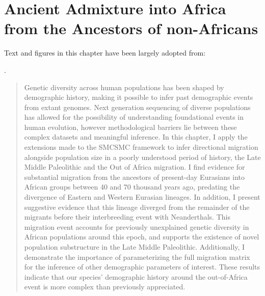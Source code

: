 

\chapter{Ancient Admixture into Africa from the Ancestors of non-Africans} \label{ch:aaa}

Text and figures in this chapter have been largely adopted from:

{\small {}. }


\begin{quote}
    \noindent \small Genetic diversity across human populations has been shaped by demographic history, making it possible to infer past demographic events from extant genomes. 
    Next generation sequencing of diverse populations has allowed for the possibility of understanding foundational events in human evolution, however methodological barriers lie between these complex datasets and meaningful inference. 
    In this chapter, I apply the extensions made to the SMCSMC framework to infer directional migration alongside population size in a poorly understood period of history, the Late Middle Paleolithic and the Out of Africa migration. 
    I find evidence for substantial migration from the ancestors of present-day Eurasians into African groups between 40 and 70 thousand years ago, predating the divergence of Eastern and Western Eurasian lineages. In addition, I present suggestive evidence that this lineage diverged from the remainder of the migrants before their interbreeding event with Neanderthals. This migration event accounts for previously unexplained genetic diversity in African populations around this epoch, and supports the existence of novel population substructure in the Late Middle Paleolithic. Additionally, I demonstrate the importance of parameterizing the full migration matrix for the inference of other demographic parameters of interest. These results indicate that our species' demographic history around the out-of-Africa event is more complex than previously appreciated. 
\end{quote}
\newpage


